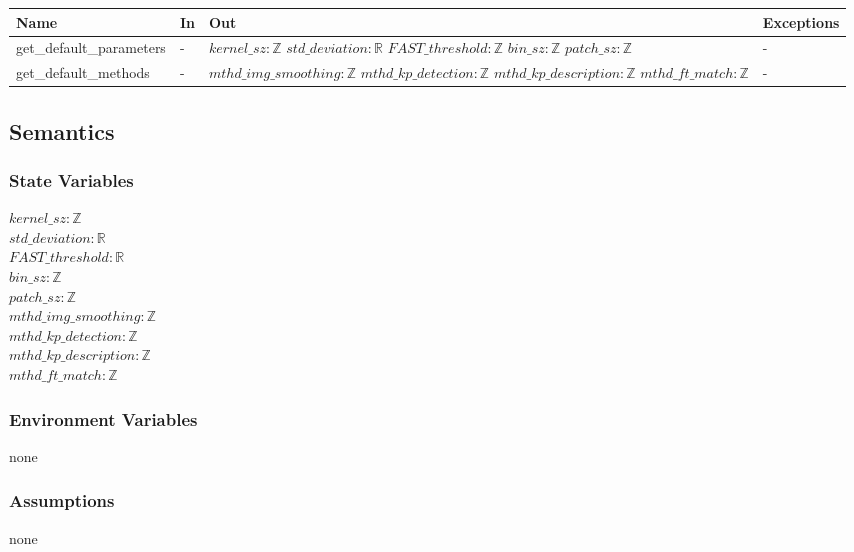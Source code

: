 \documentclass[12pt, titlepage]{article}
\begin{document}
\begin{center}
\begin{tabular}{p{4cm} p{3.5cm} p{4cm} p{3.5cm}}
\hline
\textbf{Name} & \textbf{In} & \textbf{Out} & \textbf{Exceptions} \\
\hline
get\_default\_parameters & - & 
$kernel\_sz: \mathbb{Z}$ \newline 
$std\_deviation: \mathbb{R}$ \newline 
$FAST\_threshold: \mathbb{Z}$ \newline 
$bin\_sz: \mathbb{Z}$ \newline 
$patch\_sz: \mathbb{Z}$ 
& - \\
\hline
get\_default\_methods & - & 
$mthd\_img\_smoothing:\mathbb{Z}$ \newline 
$mthd\_kp\_detection:\mathbb{Z}$ \newline 
$mthd\_kp\_description:\mathbb{Z}$ \newline 
$mthd\_ft\_match:\mathbb{Z}$ & - \\
\hline
\end{tabular}
\end{center}

\subsection{Semantics}

\subsubsection{State Variables}

$kernel\_sz: \mathbb{Z}$ \\
$std\_deviation: \mathbb{R}$ \\
$FAST\_threshold: \mathbb{R}$ \\
$bin\_sz: \mathbb{Z}$ \\
$patch\_sz: \mathbb{Z}$ \\
$mthd\_img\_smoothing: \mathbb{Z}$ \\
$mthd\_kp\_detection: \mathbb{Z}$ \\
$mthd\_kp\_description: \mathbb{Z}$ \\
$mthd\_ft\_match: \mathbb{Z}$ \\

\subsubsection{Environment Variables}
none

\subsubsection{Assumptions}
none 
\end{document}
